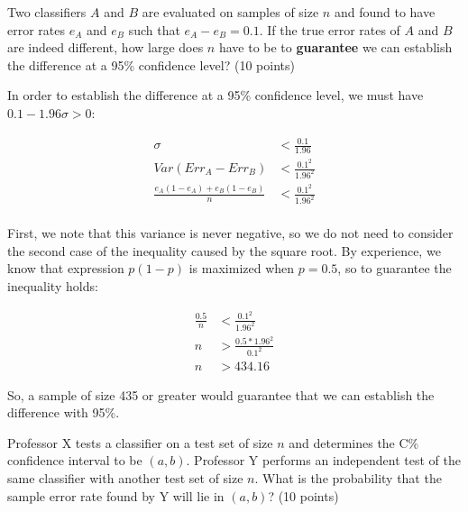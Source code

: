 \documentclass[fleqn]{homework}
\begin{document}
  \begin{problem}{2}
    \begin{question}
      Two classifiers $A$ and $B$ are evaluated on samples of size $n$ and found
      to have error rates $e_A$ and $e_B$ such that $e_A - e_B = 0.1$.  If the
      true error rates of $A$ and $B$ are indeed different, how large does $n$
      have to be to \textbf{guarantee} we can establish the difference at a 95\%
      confidence level? (10 points)
    \end{question}

    In order to establish the difference at a 95\% confidence level, we must
    have $0.1 - 1.96\sigma > 0$:

    \begin{align}
      \sigma &< \frac{0.1}{1.96} \\
      Var(Err_A - Err_B) &< \frac{0.1^2}{1.96^2} \\
      \frac{e_A(1-e_A) + e_B(1-e_B)}{n} &< \frac{0.1^2}{1.96^2} \\ 
    \end{align}

    First, we note that this variance is never negative, so we do not need to
    consider the second case of the inequality caused by the square root.  By
    experience, we know that expression $p(1-p)$ is maximized when $p=0.5$, so
    to guarantee the inequality holds:

    \begin{align}
      \frac{0.5}{n} &< \frac{0.1^2}{1.96^2} \\
      n &> \frac{0.5 * 1.96^2}{0.1^2} \\
      n &> 434.16
    \end{align}
  \end{problem}

  So, a sample of size 435 or greater would guarantee that we can establish the
  difference with 95\%.

  \begin{problem}{3}
    \begin{question}
      Professor X tests a classifier on a test set of size $n$ and determines
      the C\% confidence interval to be $(a,b)$.  Professor Y performs an
      independent test of the same classifier with another test set of size
      $n$.  What is the probability that the sample error rate found by Y will
      lie in $(a,b)$? (10 points)
    \end{question}
  \end{problem}
\end{document}

